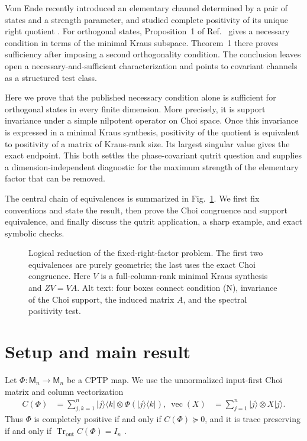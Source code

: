 \documentclass[aip,jmp,preprint]{revtex4-2}
\newcommand{\M}{\mathsf{M}}
\newcommand{\tr}{\operatorname{Tr}}
\begin{document}
Vom Ende recently introduced an elementary channel determined by a pair of states and a strength parameter, and studied complete positivity of its unique right quotient \cite{vomEnde2025}.  For orthogonal states, Proposition~1 of Ref.~ gives a necessary condition in terms of the minimal Kraus subspace.  Theorem~1 there proves sufficiency after imposing a second orthogonality condition.  The conclusion leaves open a necessary-and-sufficient characterization and points to covariant channels as a structured test class.

Here we prove that the published necessary condition alone is sufficient for orthogonal states in every finite dimension.  More precisely, it is support invariance under a simple nilpotent operator on Choi space.  Once this invariance is expressed in a minimal Kraus synthesis, positivity of the quotient is equivalent to positivity of a matrix of Kraus-rank size.  Its largest singular value gives the exact endpoint.  This both settles the phase-covariant qutrit question and supplies a dimension-independent diagnostic for the maximum strength of the elementary factor that can be removed.

The central chain of equivalences is summarized in Fig.~\ref{fig:flow}.  We first fix conventions and state the result, then prove the Choi congruence and support equivalence, and finally discuss the qutrit application, a sharp example, and exact symbolic checks.

\begin{figure}[tb]
  \centering
  
  \caption{Logical reduction of the fixed-right-factor problem.  The first two equivalences are purely geometric; the last uses the exact Choi congruence.  Here $V$ is a full-column-rank minimal Kraus synthesis and $ZV=VA$.  Alt text: four boxes connect condition (N), invariance of the Choi support, the induced matrix $A$, and the spectral positivity test.}
  \label{fig:flow}
\end{figure}

\section{Setup and main result}

Let $\Phi:\M_n\to\M_n$ be a CPTP map.  We use the unnormalized input-first Choi matrix and column vectorization
\begin{align}
 C(\Phi)&=\sum_{j,k=1}^{n}|j\rangle\langle k|\otimes
 \Phi(|j\rangle\langle k|), \label{eq:choi}\
 \operatorname{vec}(X)&=\sum_{j=1}^{n}|j\rangle\otimes X|j\rangle .
\end{align}
Thus $\Phi$ is completely positive if and only if $C(\Phi)\succeq0$, and it is trace preserving if and only if $\tr_{\mathrm{out}}C(\Phi)=I_n$ \cite{Choi1975}.
\end{document}
